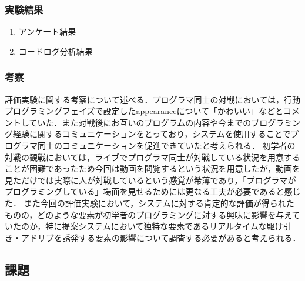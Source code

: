 \subsubsection{実験結果}

\begin{enumerate}
	\item アンケート結果

	\item コードログ分析結果
\end{enumerate}

\subsubsection{考察}
評価実験に関する考察について述べる．プログラマ同士の対戦においては，行動プログラミングフェイズで設定したappearanceについて「かわいい」などとコメントしていた．また対戦後にお互いのプログラムの内容や今までのプログラミング経験に関するコミュニケーションをとっており，システムを使用することでプログラマ同士のコミュニケーションを促進できていたと考えられる．
初学者の対戦の観戦においては，ライブでプログラマ同士が対戦している状況を用意することが困難であったため今回は動画を閲覧するという状況を用意したが，動画を見ただけでは実際に人が対戦しているという感覚が希薄であり，「プログラマがプログラミングしている」場面を見せるためには更なる工夫が必要であると感じた．
また今回の評価実験において，システムに対する肯定的な評価が得られたものの，どのような要素が初学者のプログラミングに対する興味に影響を与えていたのか，特に提案システムにおいて独特な要素であるリアルタイムな駆け引き・アドリブを誘発する要素の影響について調査する必要があると考えられる．

\subsection{課題}





